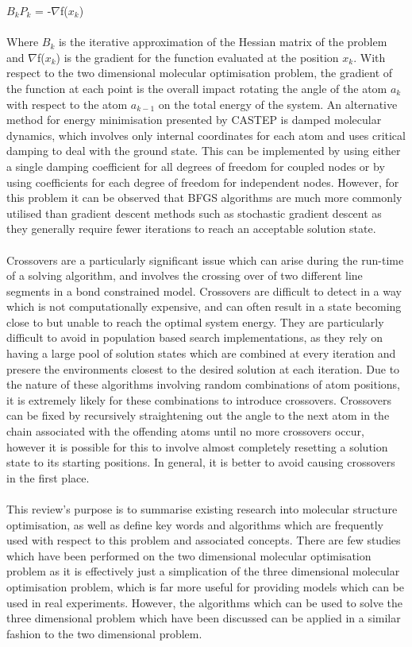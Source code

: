 \documentclass[9pt]{article}
\begin{document}
$B_{k}$$P_{k}$ = -$\nabla$f($x_{k}$)
\\
\\
Where $B_{k}$ is the iterative approximation of the Hessian matrix of the problem and $\nabla$f($x_{k}$) is the gradient for the function evaluated at the position $x_{k}$. With respect to the two dimensional molecular optimisation problem, the gradient of the function at each point is the overall impact rotating the angle of the atom $a_{k}$ with respect to the atom $a_{k-1}$ on the total energy of the system. An alternative method for energy minimisation presented by CASTEP is damped molecular dynamics, which involves only internal coordinates for each atom and uses critical damping to deal with the ground state. This can be implemented by using either a single damping coefficient for all degrees of freedom for coupled nodes or by using coefficients for each degree of freedom for independent nodes. However, for this problem it can be observed that BFGS algorithms are much more commonly utilised than gradient descent methods such as stochastic gradient descent as they generally require fewer iterations to reach an acceptable solution state.
\\
\\
Crossovers are a particularly significant issue which can arise during the run-time of a solving algorithm, and involves the crossing over of two different line segments in a bond constrained model. Crossovers are difficult to detect in a way which is not computationally expensive, and can often result in a state becoming close to but unable to reach the optimal system energy. They are particularly difficult to avoid in population based search implementations, as they rely on having a large pool of solution states which are combined at every iteration and presere the environments closest to the desired solution at each iteration. Due to the nature of these algorithms involving random combinations of atom positions, it is extremely likely for these combinations to introduce crossovers. Crossovers can be fixed by recursively straightening out the angle to the next atom in the chain associated with the offending atoms until no more crossovers occur, however it is possible for this to involve almost completely resetting a solution state to its starting positions. In general, it is better to avoid causing crossovers in the first place. 
\\
\\
This review's purpose is to summarise existing research into molecular structure optimisation, as well as define key words and algorithms which are frequently used with respect to this problem and associated concepts. There are few studies which have been performed on the two dimensional molecular optimisation problem as it is effectively just a simplication of the three dimensional molecular optimisation problem, which is far more useful for providing models which can be used in real experiments. However, the algorithms which can be used to solve the three dimensional problem which have been discussed can be applied in a similar fashion to the two dimensional problem.
\end{document}
